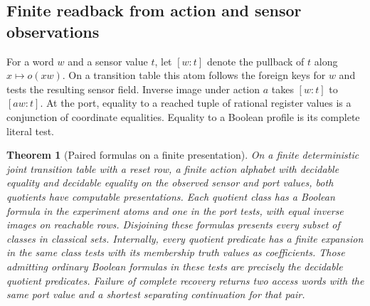 \documentclass[11pt,a4paper]{article}
\newtheorem{theorem}{Theorem}[section]
\theoremstyle{definition}
\theoremstyle{remark}\newaliascnt{remark}{theorem}
\numberwithin{equation}{section}
\begin{document}
\subsection{Finite readback from action and sensor observations}
For a word $w$ and a sensor value $t$, let $[w:t]$ denote the pullback of $t$ along $x\mapsto o(xw)$. On a transition table this atom follows the foreign keys for $w$ and tests the resulting sensor field. Inverse image under action $a$ takes $[w:t]$ to $[aw:t]$. At the port, equality to a reached tuple of rational register values is a conjunction of coordinate equalities. Equality to a Boolean profile is its complete literal test.

\begin{theorem}[Paired formulas on a finite presentation]\label{thm:ground-finite}
On a finite deterministic joint transition table with a reset row, a finite action alphabet with decidable equality and decidable equality on the observed sensor and port values, both quotients have computable presentations. Each quotient class has a Boolean formula in the experiment atoms and one in the port tests, with equal inverse images on reachable rows. Disjoining these formulas presents every subset of classes in classical sets. Internally, every quotient predicate has a finite expansion in the same class tests with its membership truth values as coefficients. Those admitting ordinary Boolean formulas in these tests are precisely the decidable quotient predicates. Failure of complete recovery returns two access words with the same port value and a shortest separating continuation for that pair.
\end{theorem}
\end{document}
